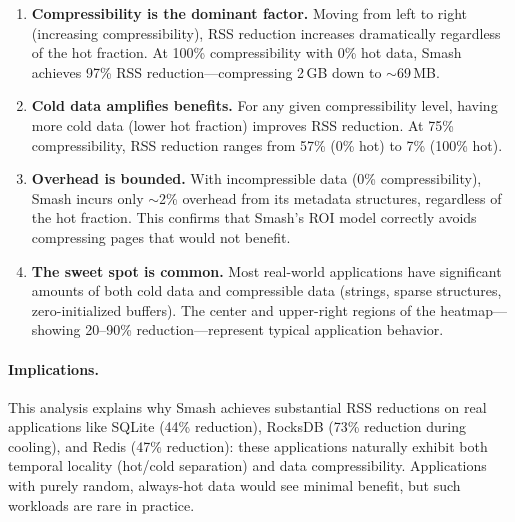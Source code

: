 \begin{enumerate}
    \item \textbf{Compressibility is the dominant factor.} Moving from left to right (increasing compressibility), RSS reduction increases dramatically regardless of the hot fraction. At 100\% compressibility with 0\% hot data, Smash achieves 97\% RSS reduction---compressing 2\,GB down to $\sim$69\,MB.

    \item \textbf{Cold data amplifies benefits.} For any given compressibility level, having more cold data (lower hot fraction) improves RSS reduction. At 75\% compressibility, RSS reduction ranges from 57\% (0\% hot) to 7\% (100\% hot).

    \item \textbf{Overhead is bounded.} With incompressible data (0\% compressibility), Smash incurs only $\sim$2\% overhead from its metadata structures, regardless of the hot fraction. This confirms that Smash's ROI model correctly avoids compressing pages that would not benefit.

    \item \textbf{The sweet spot is common.} Most real-world applications have significant amounts of both cold data and compressible data (strings, sparse structures, zero-initialized buffers). The center and upper-right regions of the heatmap---showing 20--90\% reduction---represent typical application behavior.
\end{enumerate}

\paragraph{Implications.}
This analysis explains why Smash achieves substantial RSS reductions on real applications like SQLite (44\% reduction), RocksDB (73\% reduction during cooling), and Redis (47\% reduction): these applications naturally exhibit both temporal locality (hot/cold separation) and data compressibility. Applications with purely random, always-hot data would see minimal benefit, but such workloads are rare in practice.
